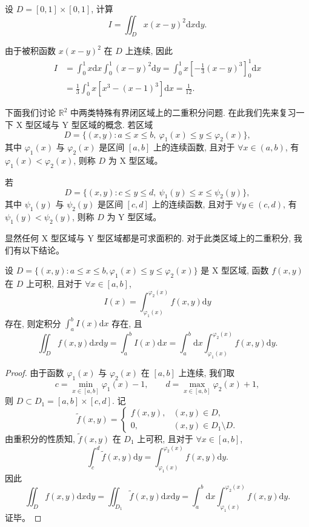 \documentclass[12pt,fontset=fandol]{ctexart}
\begin{document}
\begin{example}\label{course-example-15-3-1}\quad 设 $D=[0,1]\times[0,1]$, 计算
\[
  I=\iint_D x(x-y)^2\mathrm dx\mathrm dy.
\]

\end{example}
\begin{solve}\quad 由于被积函数 $x(x-y)^2$ 在 $D$ 上连续, 因此
\[
\begin{aligned}
  I
  &=\int_0^1 x\mathrm dx\int_0^1(x-y)^2\mathrm dy
    =\int_0^1 x\left[-\frac13(x-y)^3\right]_0^1\mathrm dx\\
  &=\frac13\int_0^1x[x^3-(x-1)^3]\mathrm dx
    =\frac1{12}.
\end{aligned}
\]

下面我们讨论 $\mathbb R^2$ 中两类特殊有界闭区域上的二重积分问题. 在此我们先来复习一下 X 型区域与 Y 型区域的概念. 若区域
\[
  D=\{(x,y):a\leqslant x\leqslant b,\ \varphi_1(x)\leqslant y\leqslant\varphi_2(x)\},
\]
其中 $\varphi_1(x)$ 与 $\varphi_2(x)$ 是区间 $[a,b]$ 上的连续函数, 且对于 $\forall x\in(a,b)$, 有 $\varphi_1(x)<\varphi_2(x)$, 则称 $D$ 为 X 型区域。

若
\[
  D=\{(x,y):c\leqslant y\leqslant d,\ \psi_1(y)\leqslant x\leqslant\psi_2(y)\},
\]
其中 $\psi_1(y)$ 与 $\psi_2(y)$ 是区间 $[c,d]$ 上的连续函数, 且对于 $\forall y\in(c,d)$, 有 $\psi_1(y)<\psi_2(y)$, 则称 $D$ 为 Y 型区域。

显然任何 X 型区域与 Y 型区域都是可求面积的. 对于此类区域上的二重积分, 我们有以下结论。

\end{solve}
\begin{theorem}\label{course-theorem-15-3-2}\quad 设 $D=\{(x,y):a\leqslant x\leqslant b,\varphi_1(x)\leqslant y\leqslant\varphi_2(x)\}$ 是 X 型区域, 函数 $f(x,y)$ 在 $D$ 上可积, 且对于 $\forall x\in[a,b]$,
\[
  I(x)=\int_{\varphi_1(x)}^{\varphi_2(x)}f(x,y)\mathrm dy
\]
存在, 则定积分 $\int_a^b I(x)\mathrm dx$ 存在, 且
\begin{equation}
  \iint_D f(x,y)\mathrm dx\mathrm dy
  =\int_a^b I(x)\mathrm dx
  =\int_a^b\mathrm dx\int_{\varphi_1(x)}^{\varphi_2(x)}f(x,y)\mathrm dy.
  \label{course-eq-15-3-1}
\end{equation}

\end{theorem}
\begin{proof}\quad 由于函数 $\varphi_1(x)$ 与 $\varphi_2(x)$ 在 $[a,b]$ 上连续, 我们取
\[
  c=\min_{x\in[a,b]}\varphi_1(x)-1,\qquad
  d=\max_{x\in[a,b]}\varphi_2(x)+1,
\]
则 $D\subset D_1=[a,b]\times[c,d]$. 记
\[
  \tilde f(x,y)=
  \begin{cases}
    f(x,y), & (x,y)\in D,\\
    0, & (x,y)\in D_1\setminus D.
  \end{cases}
\]
由重积分的性质知, $\tilde f(x,y)$ 在 $D_1$ 上可积, 且对于 $\forall x\in[a,b]$,
\[
  \int_c^d\tilde f(x,y)\mathrm dy
  =\int_{\varphi_1(x)}^{\varphi_2(x)}f(x,y)\mathrm dy.
\]
因此
\[
  \iint_D f(x,y)\mathrm dx\mathrm dy
  =\iint_{D_1}\tilde f(x,y)\mathrm dx\mathrm dy
  =\int_a^b\mathrm dx\int_{\varphi_1(x)}^{\varphi_2(x)}f(x,y)\mathrm dy.
\]
证毕。

\end{proof}
\end{document}
